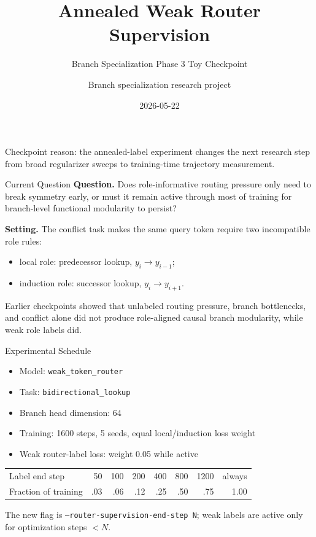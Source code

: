 \documentclass[aspectratio=169]{beamer}
\title[Annealed Router Labels]{Annealed Weak Router Supervision}
\subtitle{Branch Specialization Phase 3 Toy Checkpoint}
\author{Branch specialization research project}
\date{2026-05-22}
\begin{document}
\begin{frame}
  \titlepage
  \vspace{-0.5em}
  \small
  Checkpoint reason: the annealed-label experiment changes the next research
  step from broad regularizer sweeps to training-time trajectory measurement.
\end{frame}

\begin{frame}{Current Question}
  \textbf{Question.} Does role-informative routing pressure only need to break
  symmetry early, or must it remain active through most of training for
  branch-level functional modularity to persist?

  \vspace{1em}
  \textbf{Setting.} The conflict task makes the same query token require two
  incompatible role rules:
  \begin{itemize}
    \item local role: predecessor lookup, $y_i \rightarrow y_{i-1}$;
    \item induction role: successor lookup, $y_i \rightarrow y_{i+1}$.
  \end{itemize}

  \vspace{0.5em}
  Earlier checkpoints showed that unlabeled routing pressure, branch
  bottlenecks, and conflict alone did not produce role-aligned causal branch
  modularity, while weak role labels did.
\end{frame}

\begin{frame}{Experimental Schedule}
  \begin{itemize}
    \item Model: \texttt{weak\_token\_router}
    \item Task: \texttt{bidirectional\_lookup}
    \item Branch head dimension: 64
    \item Training: 1600 steps, 5 seeds, equal local/induction loss weight
    \item Weak router-label loss: weight 0.05 while active
  \end{itemize}

  \vspace{0.8em}
  \begin{center}
  \begin{tabular}{lrrrrrrr}
    \toprule
    Label end step & 50 & 100 & 200 & 400 & 800 & 1200 & always \\
    Fraction of training & .03 & .06 & .12 & .25 & .50 & .75 & 1.00 \\
    \bottomrule
  \end{tabular}
  \end{center}

  \vspace{0.8em}
  The new flag is \texttt{--router-supervision-end-step N}; weak labels are
  active only for optimization steps $<N$.
\end{frame}
\end{document}
